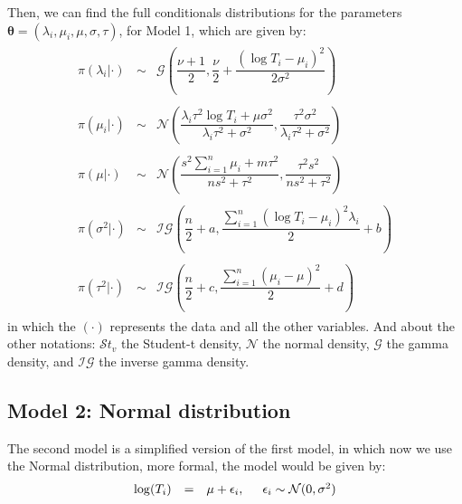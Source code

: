 \documentclass{asaproc}
\begin{document}
Then, we can find the full conditionals distributions for the parameters $\boldsymbol{\theta} = (\lambda_i,\mu_i,\mu, \sigma, \tau)$, for Model 1, which are given by:
\begin{eqnarray*}
\begin{array}{rcl}
\pi(\lambda_i|\cdot) & \sim & \mathcal{G}\left( \dfrac{\nu +1}{2}, \dfrac{\nu}{2} + \dfrac{(\log T_i - \mu_i)^2}{2\sigma^2} \right) \\ \\

\pi(\mu_i|\cdot) & \sim & \mathcal{N}\left( \dfrac{\lambda_i \tau^2\log T_i + \mu\sigma^2}{\lambda_i\tau^2+\sigma^2}, \dfrac{\tau^2\sigma^2}{\lambda_i\tau^2 + \sigma^2} \right) \\ \\

\pi(\mu|\cdot) & \sim & \mathcal{N}\left( \dfrac{s^2\sum_{i=1}^{n} \mu_i + m\tau^2}{n s^2 + \tau^2}, \dfrac{\tau^2 s^2}{n s^2 + \tau^2 } \right) \\ \\

\pi(\sigma^2|\cdot) & \sim & \mathcal{IG}\left( \dfrac{n}{2}+a,  \dfrac{\sum_{i=1}^{n} (\log T_i - \mu_i)^2 \lambda_i}{2} + b \right) \\ \\

\pi(\tau^2|\cdot) & \sim & \mathcal{IG}\left( \dfrac{n}{2}+c,  \dfrac{\sum_{i=1}^{n} (\mu_i - \mu)^2}{2} + d \right)
\end{array}
\end{eqnarray*}
in which the $(\cdot)$ represents the data and all the other variables. And about the other notations: $\mathcal{S}t_v$ the Student-t density, $\mathcal{N}$ the normal density, $\mathcal{G}$ the gamma density, and $\mathcal{IG}$ the inverse gamma density.

\subsection{Model 2: Normal distribution} 

The second model is a simplified version of the first model, in which now we use the Normal distribution, more formal, the model would be given by:
\begin{eqnarray*}
\begin{array}{rcl }
\log(T_i) & = & \mu + \epsilon_i, \hspace{0.5cm} \epsilon_i \sim \mathcal{N}(0,\sigma^2) \\
\end{array}
\end{eqnarray*}
\end{document}
